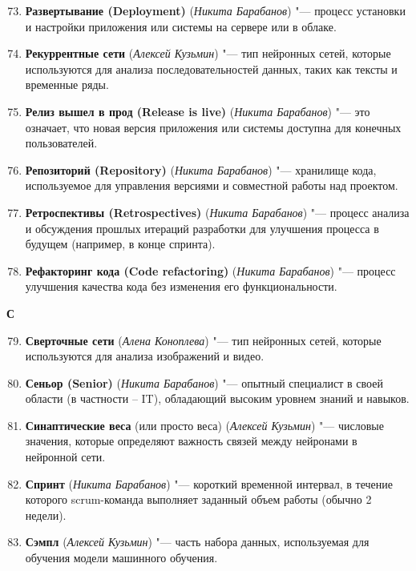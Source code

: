\begin{enumerate}
    \setcounter{enumi}{72}

    \item \textbf{Развертывание (Deployment)} (\textit{Никита Барабанов}) "--- 
    процесс установки и настройки приложения или системы на сервере или в облаке.

    \item \textbf{Рекуррентные сети} (\textit{Алексей Кузьмин}) "--- 
    тип нейронных сетей, которые используются для анализа последовательностей данных, таких как тексты и временные ряды. 

    \item \textbf{Релиз вышел в прод (Release is live)} (\textit{Никита Барабанов}) "--- 
    это означает, что новая версия приложения или системы доступна для конечных пользователей. 

    \item \textbf{Репозиторий (Repository)} (\textit{Никита Барабанов}) "--- 
    хранилище кода, используемое для управления версиями и совместной работы над проектом.

    \item \textbf{Ретроспективы (Retrospectives)} (\textit{Никита Барабанов}) "--- 
    процесс анализа и обсуждения прошлых итераций разработки для улучшения процесса в будущем (например, в конце спринта).

    \item \textbf{Рефакторинг кода (Code refactoring)} (\textit{Никита Барабанов}) "--- 
    процесс улучшения качества кода без изменения его функциональности.
\end{enumerate}

\begin{flushleft} \large\textbf{С} \end{flushleft}

\begin{enumerate}
    \setcounter{enumi}{78}

    \item \textbf{Сверточные сети} (\textit{Алена Коноплева}) "--- 
    тип нейронных сетей, которые используются для анализа изображений и видео.

    \item \textbf{Сеньор (Senior)} (\textit{Никита Барабанов}) "--- 
    опытный специалист в своей области (в частности -- IT), обладающий высоким уровнем знаний и навыков. 

    \item \textbf{Синаптические веса} (или просто веса) (\textit{Алексей Кузьмин}) "--- 
    числовые значения, которые определяют важность связей между нейронами в нейронной сети. 

    \item \textbf{Спринт} (\textit{Никита Барабанов}) "--- 
    короткий временной интервал, в течение которого scrum-команда выполняет заданный объем работы (обычно 2 недели). 

    \item \textbf{Сэмпл} (\textit{Алексей Кузьмин}) "--- 
    часть набора данных, используемая для обучения модели машинного обучения. 
\end{enumerate}

